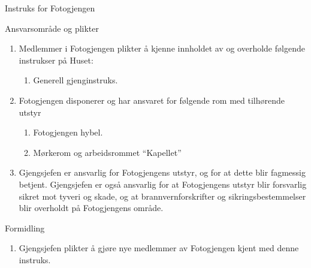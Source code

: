 \begin{instruks}{Instruks for Fotogjengen}{ }{ }
    \begin{instruksledd}{Ansvarsområde og plikter}
        \begin{enumerate}
            \item Medlemmer i Fotogjengen plikter å kjenne innholdet av og overholde følgende instrukser
                på Huset:
                \begin{enumerate}
                    \item Generell gjenginstruks.
                \end{enumerate}
            \item Fotogjengen disponerer og har ansvaret for følgende rom med tilhørende utstyr
                \begin{enumerate}
                    \item Fotogjengen hybel.
                    \item Mørkerom og arbeidsrommet ``Kapellet''
                \end{enumerate}
            \item Gjengsjefen er ansvarlig for Fotogjengens utstyr, og for at dette blir fagmessig
                betjent. Gjengsjefen er også ansvarlig for at Fotogjengens utstyr blir forsvarlig sikret mot tyveri og skade, og at
                brannvernforskrifter og sikringsbestemmelser blir overholdt på Fotogjengens område.
        \end{enumerate}
    \end{instruksledd}
    
    \begin{instruksledd}{Formidling}
        \begin{enumerate}
            \item Gjengsjefen plikter å gjøre nye medlemmer av Fotogjengen kjent med denne
                instruks.
        \end{enumerate}
    \end{instruksledd}

\end{instruks}
